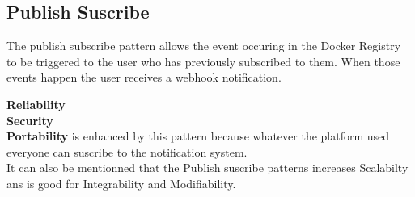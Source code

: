 \subsection{Publish Suscribe}

The publish subscribe pattern allows the event occuring in the Docker Registry to be triggered to the user who has previously subscribed to them. When those events happen the user receives a webhook notification.

\textbf{Reliability} \\
\textbf{Security} \\
\textbf{Portability} is enhanced by this pattern because whatever the platform used everyone can suscribe to the notification system.\\

It can also be mentionned that the Publish suscribe patterns increases Scalabilty ans is good for Integrability and Modifiability.

